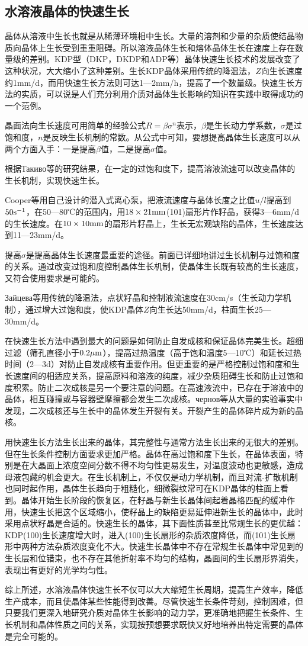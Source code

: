 \subsection{水溶液晶体的快速生长}
晶体从溶液中生长也就是从稀薄环境相中生长。大量的溶剂和少量的杂质使结晶物质向晶体上生长受到重重阻碍。所以溶液晶体生长和熔体晶体生长在速度上存在数量级的差别。KDP型（DKP，DKDP和ADP等）晶体快速生长技术的发展改变了这种状况，大大缩小了这种差别。生长KDP晶体采用传统的降温法，$Z$向生长速度约1mm/d，而用快速生长方法则可达1---2mm/h，提高了一个数量级。快速生长方法的实质，可以说是人们充分利用介质对晶体生长影响的知识在实践中取得成功的一个范例。

晶面法向生长速度可用简单的经验公式$R=\beta\sigma^n$表示，$\beta$是生长动力学系数，$\sigma$是过饱和度，$n$是反映生长机制的常数。从公式中可知，要想提高晶体生长速度可以从两个方面入手：一是提高$\beta$值，二是提高$\sigma$值。

根据{\timesnewroman Такиво}等的研究结果，在一定的过饱和度下，提高溶液流速可以改变晶体的生长机制，实现快速生长。

Cooper等用自己设计的潜入式离心泵，把液流速度与晶体长度之比值$u/l$提高到$\rm 50s^{-1}$，在50---80℃的范围内，用$\rm 18\times 21mm$(101)扇形片作籽晶，获得3---6mm/d的生长速度。在$10\times10\rm mm$的扇形片籽晶上，生长无宏观缺陷的晶体，生长速度达到11---23mm/d。

提高$\sigma$是提高晶体生长速度最重要的途径。前面已详细地讲过生长机制与过饱和度的关系。通过改变过饱和度控制晶体生长机制，使晶体生长既有较高的生长速度，又符合使用要求是可能的。

{\timesnewroman Зайцева}等用传统的降温法，点状籽晶和控制液流速度在30cm/s（生长动力学机制），通过增大过饱和度，使KDP晶体$Z$向生长达50mm/d，柱面生长25---30mm/d。

在快速生长方法中遇到最大的问题是如何防止自发成核和保证晶体完美生长。超细过滤（筛孔直径小于$0.2\rm\mu m$），提高过热温度（高于饱和温度5---10℃）和延长过热时间（2---3d）对防止自发成核有重要作用。但更重要的是严格控制过饱和度和生长速度间的相适应关系，提高原料和溶液的纯度，减少杂质阻碍生长和防止过饱和度积累。防止二次成核是另一个要注意的问题。在高速液流中，已存在于溶液中的晶体，相互碰撞或与容器壁摩擦都会发生二次成核。{\timesnewroman чернов}等从大量的实验事实中发现，二次成核还与生长中的晶体发生开裂有关。开裂产生的晶体碎片成为新的晶核。

用快速生长方法生长出来的晶体，其完整性与通常方法生长出来的无很大的差别。但在生长条件控制方面要求更加严格。晶体在高过饱和度下生长，在晶体表面，特别是在大晶面上浓度空间分数不得不均匀性更易发生，对温度波动也更敏感，造成母液包藏的机会更大。在生长机制上，不仅仅是动力学机制，而且对流-扩散机制也同时起作用，晶体生长趋向于粗糙化，细微裂纹常可在KDP晶体的柱面上看到。晶体开始生长阶段的恢复区，在籽晶与新生长晶体间起着晶格匹配的缓冲作用，快速生长把这个区域缩小，使籽晶上的缺陷更易延伸进新生长的晶体中，此时采用点状籽晶是合适的。快速生长的晶体，其下面性质甚至比常规生长的更优越：KDP(100)生长速度增大时，进入(100)生长扇形的杂质浓度降低，而(101)生长扇形中两种方法杂质浓度变化不大。快速生长晶体中不存在常规生长晶体中常见到的生长层和位错束，也不存在其他折射率不均匀的结构，晶面间的生长扇形界消失，表现出有更好的光学均匀性。

综上所述，水溶液晶体快速生长不仅可以大大缩短生长周期，提高生产效率，降低生产成本，而且使晶体某些性能得到改善。尽管快速生长条件苛刻，控制困难，但只要我们更深入地研究介质对晶体生长影响的动力学，更准确地把握生长条件、生长机制和晶体性质之间的关系，实现按预想要求既快又好地培养出特定需要的晶体是完全可能的。